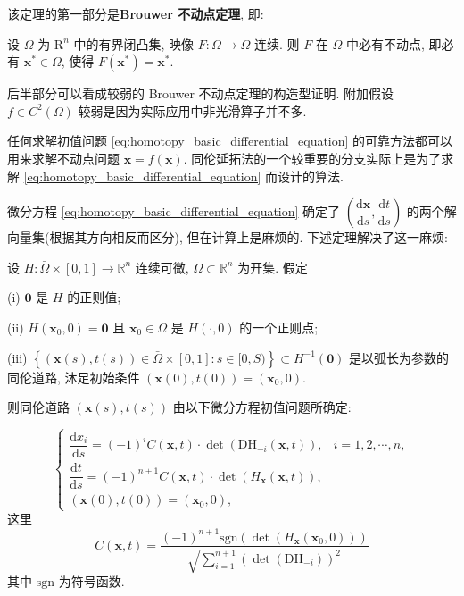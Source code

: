 该定理的第一部分是\textbf{Brouwer 不动点定理}, 即:
\begin{theorem}
  设 \(\Omega\) 为 \(\mathrm{R}^n\) 中的有界闭凸集, 映像 \(F:\Omega\to \Omega\) 连续. 则 \(F\) 在 \(\Omega\) 中必有不动点, 即必有 \(\boldsymbol{x}^*\in \Omega\), 使得 \(F \left(\boldsymbol{x}^*\right)=\boldsymbol{x}^*\).
\end{theorem}

后半部分可以看成较弱的 Brouwer 不动点定理的构造型证明. 附加假设 \(f\in C^2(\Omega)\) 较弱是因为实际应用中非光滑算子并不多.

任何求解初值问题 \eqref{eq:homotopy_basic_differential_equation} 的可靠方法都可以用来求解不动点问题 \(\boldsymbol{x}=f(\boldsymbol{x})\). 同伦延拓法的一个较重要的分支实际上是为了求解 \eqref{eq:homotopy_basic_differential_equation} 而设计的算法.

微分方程 \eqref{eq:homotopy_basic_differential_equation} 确定了 \(\left(\dfrac{\mathrm{d} \boldsymbol{x}}{\mathrm{d} s},\dfrac{\mathrm{d} t}{\mathrm{d} s}\right)\) 的两个解向量集(根据其方向相反而区分), 但在计算上是麻烦的. 下述定理解决了这一麻烦:

\begin{theorem}[基本微分方程]
  设 \(H:\bar \Omega\times[0,1]\to\mathbb{R}^n\) 连续可微, \(\Omega\subset\mathbb{R}^n\) 为开集. 假定

  (i) \(\boldsymbol{0}\) 是 \(H\) 的正则值;

  (ii) \(H(\boldsymbol{x}_0,0)=\boldsymbol{0}\) 且 \(\boldsymbol{x}_0\in \Omega\) 是 \(H(\cdot,0)\) 的一个正则点;

  (iii) \(\left\lbrace (\boldsymbol{x}(s),t(s))\in\bar \Omega\times[0,1]: s\in[0,S)\right\rbrace\subset H^{-1}(\boldsymbol{0})\) 是以弧长为参数的同伦道路, 沐足初始条件 \((\boldsymbol{x}(0),t(0))=(\boldsymbol{x}_0,0)\).

  则同伦道路 \((\boldsymbol{x}(s),t(s))\) 由以下微分方程初值问题所确定:

  \begin{equation*}
    \begin{cases}
      \dfrac{\mathrm{d} x_i}{\mathrm{d} s}=(-1)^iC(\boldsymbol{x},t)\cdot\det(\mathrm{DH}_{-i}(\boldsymbol{x},t)), & i=1,2,\cdots,n, \\
      \dfrac{\mathrm{d} t}{\mathrm{d} s}=(-1)^{n+1}C(\boldsymbol{x},t)\cdot\det(H_{\boldsymbol{x}}(\boldsymbol{x},t)), \\
      (\boldsymbol{x}(0),t(0))=(\boldsymbol{x}_0,0),
    \end{cases}
  \end{equation*}
  这里
  \begin{equation*}
    C(\boldsymbol{x},t)=\frac{(-1)^{n+1}\mathrm{sgn}(\det(H_{\boldsymbol{x}}(\boldsymbol{x}_0,0)))}{\sqrt{\sum\limits_{i=1}^{n+1} \left(\det(\mathrm{DH}_{-i})\right)^2}}
  \end{equation*}
  其中 \(\mathrm{sgn}\) 为符号函数.
\end{theorem}


